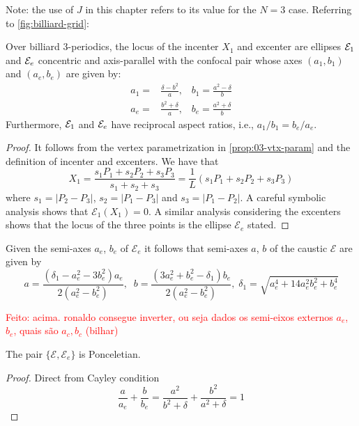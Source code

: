 \noindent Note: the use of $J$ in this chapter refers to its value for the $N=3$ case. Referring to \cref{fig:billiard-grid}:

\begin{theorem}
Over billiard 3-periodics, the locus of the incenter $X_1$ and excenter are ellipses $\mathcal{E}_1$ and $\mathcal{E}_e$ concentric and axis-parallel with the confocal pair whose axes $(a_1,b_1)$ and $(a_e,b_e)$ are given by:
\begin{align*}
a_1 =& \frac{\delta-b^2 }{a},\;\;\;b_1=\frac{a^2-\delta}{b}\\ 
a_e= &\frac{{b}^{2}+\delta}{a},\;\;\;b_e=\frac{{a}^{2}+\delta}{b}
\end{align*}
Furthermore, $\mathcal{E}_1$ and $\mathcal{E}_e$ have reciprocal aspect ratios, i.e., $a_1/b_1=b_e/a_e$.
\label{thm:03-incenter-excenter}
\end{theorem}

\begin{proof}
It follows from the vertex parametrization in \cref{prop:03-vtx-param} and the definition of incenter and excenters.  
We have that
\[X_1=\frac{s_1 P_1+s_2P_2+s_3P_3}{s_1+s_2+s_3}=
\frac{1}{L}(s_1P_1+s_2P_2+s_3P_3)\]
where $s_1=|P_2-P_3|$, $s_2=|P_1-P_3|$ and $s_3=|P_1-P_2|$.
A careful symbolic analysis shows that $\mathcal{E}_1(X_1)=0$. A similar analysis considering the excenters shows that the locus of the three points is the ellipse $\mathcal{E}_e$ stated.
\end{proof}

\begin{remark} Given the semi-axes $a_e$, $b_e$ of $\mathcal{E}_e$ it follows that semi-axes $a$, $b$ of the caustic $\mathcal{E}$ are given by
\[a=\frac{(\delta_1- a_e^2 - 3b_e^2) a_e}{2(a_e^2 -  b_e^2)},\;\; b=\frac{(3a_e^2 + b_e^2 - \delta_1)b_e}{2(a_e^2 - b_e^2)},\;
  \delta_1=\sqrt{a_e^4 + 14a_e^2b_e^2 + b_e^4}\]

\end{remark}
\textcolor{red}{Feito:  acima. ronaldo consegue inverter, ou seja dados os semi-eixos externos $a_e$, $b_e$, quais são $a_c,b_c$ (bilhar)}

\begin{corollary}
The pair $\{\mathcal{E},\mathcal{E}_e\}$ is Ponceletian.
\label{cor:03-excentral-billiard-poncelet}
\end{corollary}

\begin{proof}
Direct from Cayley condition
\[\frac{a}{a_e}+\frac{b}{b_e}=\frac{a^2}{b^2+\delta}+\frac{b^2}{a^2+\delta}= 1\]

\end{proof}


